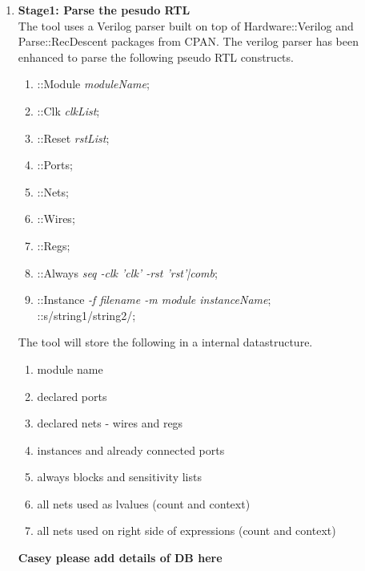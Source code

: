 \documentclass[11pt]{article}
\begin{document}
\begin{enumerate}
\item \textbf{Stage1: Parse the pesudo RTL} \\
The tool uses a Verilog parser built on top of Hardware::Verilog and Parse::RecDescent packages from CPAN. The verilog parser has been enhanced to parse the following pseudo RTL constructs.
	\begin{enumerate}
	\item ::Module \emph{moduleName}; 
	\item ::Clk \emph{clkList};
	\item ::Reset \emph{rstList};
	\item ::Ports;
	\item ::Nets;
	\item ::Wires;
	\item ::Regs;
	\item ::Always \emph{seq -clk 'clk' -rst 'rst'|comb};
	\item ::Instance \emph{-f filename -m module instanceName}; \\ ::s/string1/string2/;
	\end{enumerate}
The tool will store the following in a internal datastructure. 
	\begin{enumerate}
	\item module name
	\item declared ports
	\item declared nets - wires and regs
	\item instances and already connected ports
	\item always blocks and sensitivity lists
	\item all nets used as lvalues (count and context)
	\item all nets used on right side of expressions (count and context)
	\end{enumerate}
\textbf{Casey please add details of DB here}\\


\end{enumerate}
\end{document}
